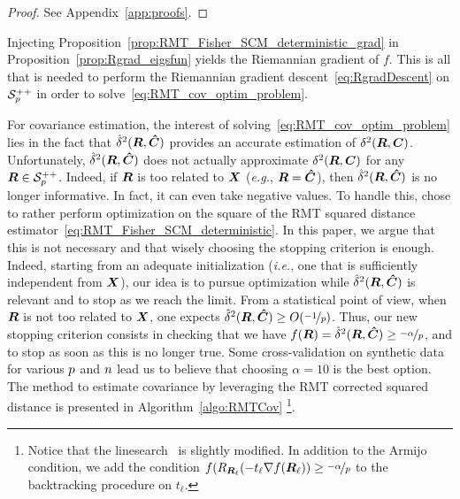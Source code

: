 \documentclass{article}
\theoremstyle{plain}
\theoremstyle{definition}
\theoremstyle{remark}
\newtheorem{remark}[theorem]{Remark}
\begin{document}
\begin{proof}
    See Appendix~\ref{app:proofs}.
\end{proof}
%
Injecting Proposition~\ref{prop:RMT_Fisher_SCM_deterministic_grad} in Proposition~\ref{prop:Rgrad_eigsfun} yields the Riemannian gradient of $f$.
This is all that is needed to perform the Riemannian gradient descent~\eqref{eq:RgradDescent} on $\mathcal{S}^{++}_{p}$ in order to solve~\eqref{eq:RMT_cov_optim_problem}.

For covariance estimation, the interest of solving~\eqref{eq:RMT_cov_optim_problem} lies in the fact that $\hat{\delta}^2(\boldsymbol{R},\boldsymbol{\hat{C}})$ provides an accurate estimation of $\delta^2(\boldsymbol{R},\boldsymbol{C})$.
Unfortunately, $\hat{\delta}^2(\boldsymbol{R},\boldsymbol{\hat{C}})$ does not actually approximate $\delta^2(\boldsymbol{R},\boldsymbol{C})$ for any $\boldsymbol{R}\in\mathcal{S}^{++}_{p}$.
Indeed, if $\boldsymbol{R}$ is too related to $\boldsymbol{X}$ (\emph{e.g.}, $\boldsymbol{R}=\boldsymbol{\hat{C}}$), then $\hat{\delta}^2(\boldsymbol{R},\boldsymbol{\hat{C}})$ is no longer informative.
In fact, it can even take negative values.
%
To handle this, \cite{tiomoko2019random} chose to rather perform optimization on the square of the RMT squared distance estimator~\eqref{eq:RMT_Fisher_SCM_deterministic}.
In this paper, we argue that this is not necessary and that wisely choosing the stopping criterion is enough.
Indeed, starting from an adequate initialization (\emph{i.e.}, one that is sufficiently independent from $\boldsymbol{X}$), our idea is to pursue optimization while $\hat{\delta}^2(\boldsymbol{R},\boldsymbol{\hat{C}})$ is relevant and to stop as we reach the limit.
%
From a statistical point of view, when $\boldsymbol{R}$ is not too related to $\boldsymbol{X}$, one expects $\hat{\delta}^2(\boldsymbol{R},\boldsymbol{\hat{C}})\geq O(\nicefrac{-1}{p})$.
Thus, our new stopping criterion consists in checking that we have $f(\boldsymbol{R})=\hat{\delta}^2(\boldsymbol{R},\boldsymbol{\hat{C}})\geq\nicefrac{-\alpha}{p}$, and to stop as soon as this is no longer true.
Some cross-validation on synthetic data for various $p$ and $n$ lead us to believe that choosing $\alpha=10$ is the best option.
%
The method to estimate covariance by leveraging the RMT corrected squared distance is presented in Algorithm~\ref{algo:RMTCov}%
\footnote{
    Notice that the linesearch~\cite{absil2009optimization,boumal2023introduction} is slightly modified.
    In addition to the Armijo condition, we add the condition $f(R_{\boldsymbol{R}_{\ell}}(-t_{\ell}\nabla f(\boldsymbol{R}_{\ell}))\geq\nicefrac{-\alpha}{p}$ to the backtracking procedure on $t_{\ell}$.
}.
\end{document}
